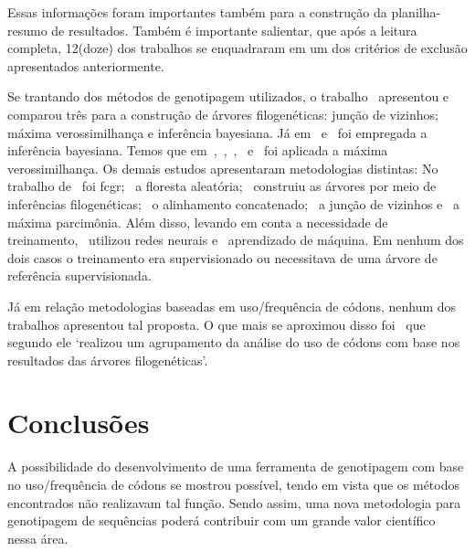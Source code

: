 \documentclass[12pt]{article}
\begin{document}
Essas informações foram importantes também para a construção da planilha-resumo de resultados. Também é importante salientar, que após a leitura completa, 12(doze) dos trabalhos se enquadraram em um dos critérios de exclusão apresentados anteriormente.

Se trantando dos métodos de genotipagem utilizados, o trabalho~\cite{dimitrov_updated_2019} apresentou e comparou três para a construção de árvores filogenéticas: junção de vizinhos; máxima verossimilhança e inferência bayesiana.
Já em~\cite{yin_systematic_2019} e~\cite{bedoya-pilozo_molecular_epidemiology_2018} foi empregada a inferência bayesiana. Temos que em~\cite{fall_genetic_diversity_2021},~\cite{behl_threat_2022},~\cite{shabbir_comprehensive_2020},~\cite{hudu_hepatitis_2018} e~\cite{cho_analysis_2022} foi aplicada a máxima verossimilhança.
Os demais estudos apresentaram metodologias distintas: No trabalho de~\cite{lichtblau_alignment-free_2019} foi \gls{fcgr};~\cite{kim_ngs_2022} a floresta aleatória;~\cite{sallard_tracing_2021} construiu as árvores por meio de inferências filogenéticas;~\cite{paez-espino_diversity_evolution_2019} o alinhamento concatenado;~\cite{potdar_phylogenetic_2021} a junção de vizinhos e~\cite{tang_evolutionary_2021} a máxima parcimônia.
Além disso, levando em conta a necessidade de treinamento,~\cite{lichtblau_alignment-free_2019} utilizou redes neurais e~\cite{kim_ngs_2022} aprendizado de máquina. Em nenhum dos dois casos o treinamento era supervisionado ou necessitava de uma árvore de referência supervisionada.

Já em relação metodologias baseadas em uso/frequência de códons, nenhum dos trabalhos apresentou tal proposta. O que mais se aproximou disso foi~\cite{cho_analysis_2022} que segundo ele `realizou um agrupamento da análise do uso de códons com base nos resultados das árvores filogenéticas'.

\section{Conclusões}

A possibilidade do desenvolvimento de uma ferramenta de genotipagem com base no uso/frequência de códons se mostrou possível, tendo em vista que os métodos encontrados não realizavam tal função. Sendo assim, uma nova metodologia para genotipagem de sequências poderá contribuir com um grande valor científico nessa área.



\end{document}

